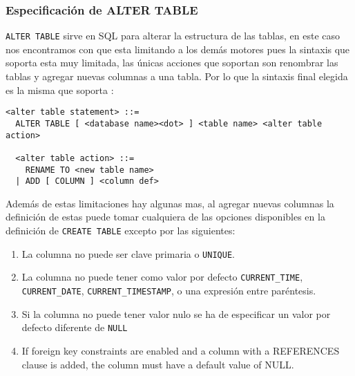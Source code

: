 \subsubsection{Especificación de ALTER TABLE} 
\label{especificacion:dialectos:altertable}
\verb=ALTER TABLE= sirve en SQL para alterar la estructura de las tablas, en este caso nos encontramos con que \s esta limitando a los demás motores pues la sintaxis que soporta esta muy limitada, las únicas acciones que soportan son renombrar las tablas y agregar nuevas columnas a una tabla. Por lo que la sintaxis final elegida es la misma que soporta \s:
%
%  
\begin{Verbatim}[frame=single, label=sintaxis para ALTER TABLE]
<alter table statement> ::= 
  ALTER TABLE [ <database name><dot> ] <table name> <alter table action>
  
  <alter table action> ::=
    RENAME TO <new table name>
  | ADD [ COLUMN ] <column def>
\end{Verbatim}
%
Además de estas limitaciones hay algunas mas, al agregar nuevas columnas la definición de estas puede tomar cualquiera de las opciones disponibles en la definición de \verb=CREATE TABLE= excepto por las siguientes:
%
\begin{enumerate}
%
\item La columna no puede ser clave primaria o \verb=UNIQUE=.
%
\item La columna no puede tener como valor por defecto \verb=CURRENT_TIME=, \verb=CURRENT_DATE=, \verb=CURRENT_TIMESTAMP=, o una expresión entre paréntesis.
%
\item Si la columna no puede tener valor nulo se ha de especificar un valor por defecto diferente de \verb=NULL=
%
\item If foreign key constraints are enabled and a column with a REFERENCES clause is added, the column must have a default value of NULL.
%
\end{enumerate}
%
%
%
